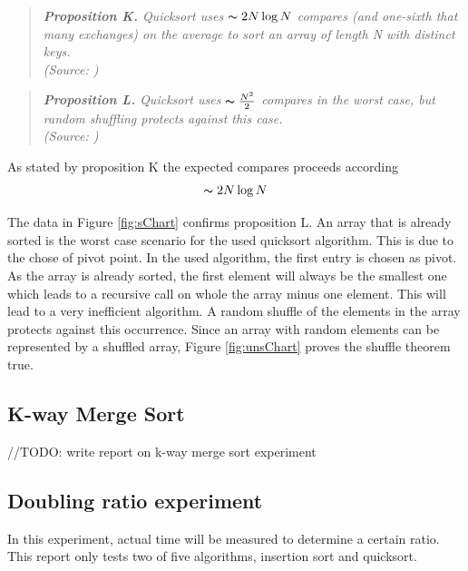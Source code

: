 \documentclass[pdftex,11pt,a4paper,english,titlepage]{article}
\begin{document}
\begin{quote}
\em \noindent \textbf{Proposition K.} Quicksort uses $\thicksim 2N\log N$ compares (and one-sixth that many exchanges) on the average to sort an array of length N with distinct keys.\\
\tiny (Source: \cite{Sedgewick2011})
\end{quote}

\begin{quote}
\em \noindent \textbf{Proposition L.} Quicksort uses $\thicksim\frac{N^2}{2}$ compares in the worst case, but random shuffling protects against this case.\\
\tiny (Source: \cite{Sedgewick2011})
\end{quote}
As stated by proposition K the expected compares proceeds according $$\thicksim 2N\log N$$

The data in Figure \ref{fig:sChart} confirms proposition L. An array that is already sorted is the worst case scenario for the used quicksort algorithm. This is due to the chose of pivot point. In the used algorithm, the first entry is chosen as pivot. As the array is already sorted, the first element will always be the smallest one which leads to a recursive call on whole the array minus one element. This will lead to a very inefficient algorithm. A random shuffle of the elements in the array protects against this occurrence. Since an array with random elements can be represented by a shuffled array, Figure \ref{fig:unsChart} proves the shuffle theorem true.

	\subsection{K-way Merge Sort}
		//TODO: write report on k-way merge sort experiment
		
	\subsection{Doubling ratio experiment}
In this experiment, actual time will be measured to determine a certain ratio. This report only tests two of five algorithms, insertion sort and quicksort.
\end{document}
